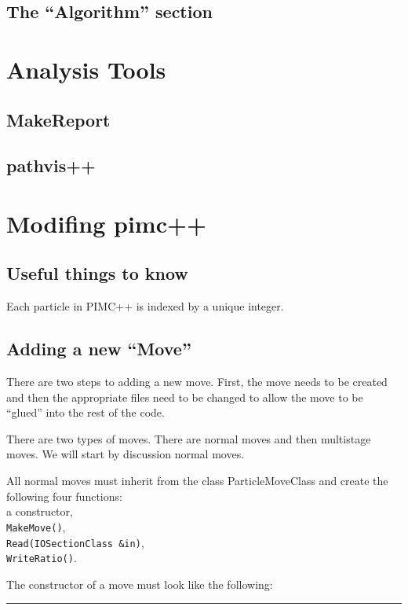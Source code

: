 \documentclass{book}
\begin{document}
\section{The ``Algorithm'' section}

\chapter{Analysis Tools}
\section{MakeReport}
\section{pathvis++}


\chapter{Modifing pimc++}
\section{Useful things to know}
Each particle in PIMC++ is indexed by a unique integer. 
\section{Adding a new ``Move''}
There are two steps to adding a new move. First, the move needs to be
created and then the appropriate files need to be changed to allow the
move to be ``glued'' into the rest of the code.

There are two types of moves. There are normal moves and then
multistage moves. We will start by discussion normal moves.

All normal moves must inherit from the class ParticleMoveClass and 
create the following four functions: \\
a constructor,\\
\texttt{MakeMove()},\\
\texttt{Read(IOSectionClass \&in)},  \\
\texttt{WriteRatio()}.

The constructor of a move must look like the following:\\

\rule{0.6cm}{0cm}
\end{document}

